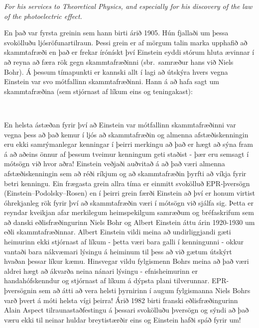 \ifdefined \wholebook \else\documentclass[oneside]{book}\usepackage{EdlBook}\graphicspath{{figures/}}
\begin{document}
\vspace{0.1cm}
 \textit{For his services to Theoretical Physics, and especially for his discovery of the law of the photoelectric effect.}
 \vspace{0.3cm}
 
 En það var fyrsta greinin sem hann birti árið 1905. Hún fjallaði um þessa svokölluðu ljósröfunartilraun. Þessi grein er af mörgum talin marka upphafið að skammtafræði en það er frekar írónískt því Einstein eyddi stórum hluta ævinnar í að reyna að færa rök gegn skammtafræðinni (sbr.~samræður hans við Niels Bohr). Á þessum tímapunkti er kannski allt í lagi að útskýra hvers vegna Einstein var svo mótfallinn skammtafræðinni. Hann á að hafa sagt um skammtafræðina (sem stjórnast af líkum eins og teningakast):
 
\begin{tcolorbox}
 \\

\vspace{-0.5cm}
\end{tcolorbox}

En helsta ástæðan fyrir því að Einstein var mótfallinn skammtafræðinni var vegna þess að það kemur í ljós að skammtafræðin og almenna afstæðiskenningin eru ekki samrýmanlegar kenningar í þeirri merkingu að það er hægt að sýna fram á að aðeins önnur af þessum tveimur kenningum geti staðist - þær eru semsagt í mótsögn við hvor aðra! Einstein veðjaði auðvitað á að það væri almenna afstæðiskenningin sem að réði ríkjum og að skammtafræðin þyrfti að víkja fyrir betri kenningu. Ein frægasta grein allra tíma er einmitt svokölluð EPR-þversögn (Einstein–Podolsky–Rosen) en í þeirri grein færði Einstein að því er honum virtist óhrekjanleg rök fyrir því að skammtafræðin væri í mótsögn við sjálfa sig. Þetta er reyndar kveikjan afar merkilegum heimspekilgum samræðum og bréfaskrifum sem að danski eðlisfræðingurinn Niels Bohr og Albert Einstein áttu árin 1920-1930 um eðli skammtafræðinnar. Albert Einstein vildi meina að undirliggjandi gæti heimurinn ekki stjórnast af líkum - þetta væri bara galli í kenningunni - okkur vantaði bara nákvæmari lýsingu á heiminum til þess að við gætum útskýrt hvaðan þessar líkur kæmu. Hinsvegar vildu fylgismenn Bohrs meina að það væri aldrei hægt að ákvarða neina nánari lýsingu - efnisheimurinn er handahófskenndur og stjórnast af líkum á dýpsta plani tilverunnar. EPR-þversögnin sem að átti að vera helsti þyrnirinn í augum fylgismanna Niels Bohrs varð þvert á móti helsta vígi þeirra! Árið 1982 birti franski eðlisfræðingurinn Alain Aspect tilraunastaðfestingu á þessari svokölluðu þversögn og sýndi að það væru ekki til neinar huldar breytistærðir eins og Einstein hafði spáð fyrir um!
\end{document}
